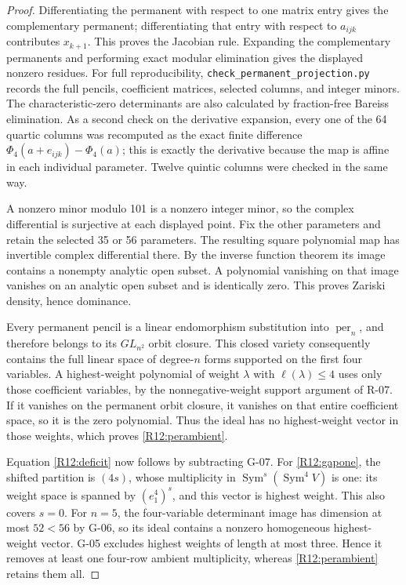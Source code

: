 \documentclass[11pt,a4paper]{article}
\theoremstyle{definition}\newtheorem{definition}{Definition}
\begin{document}
\begin{proof}
Differentiating the permanent with respect to one matrix entry
gives the complementary permanent; differentiating that entry
with respect to $a_{ijk}$ contributes $x_{k+1}$. This proves the
Jacobian rule. Expanding the complementary permanents and
performing exact modular elimination gives the displayed
nonzero residues. For full reproducibility,
\nolinkurl{check_permanent_projection.py} records the full pencils,
coefficient matrices, selected columns, and integer minors.
The characteristic-zero determinants are also calculated by
fraction-free Bareiss elimination. As a second check on the
derivative expansion, every one of the 64 quartic columns was
recomputed as the exact finite difference
$\Phi_4(a+e_{ijk})-\Phi_4(a)$; this is exactly the derivative
because the map is affine in each individual parameter.
Twelve quintic columns were checked in the same way.

A nonzero minor modulo 101 is a nonzero integer minor, so the
complex differential is surjective at each displayed point.
Fix the other parameters and retain the selected 35 or 56
parameters. The resulting square polynomial map has invertible
complex differential there. By the inverse function theorem its
image contains a nonempty analytic open subset. A polynomial
vanishing on that image vanishes on an analytic open subset and
is identically zero. This proves Zariski density, hence dominance.

Every permanent pencil is a linear endomorphism substitution
into $\operatorname{per}_n$, and therefore belongs to its
$GL_{n^2}$ orbit closure. This closed variety consequently
contains the full linear space of degree-$n$ forms supported on
the first four variables. A highest-weight polynomial of weight
$\lambda$ with $\ell(\lambda)\leq4$ uses only those coefficient
variables, by the nonnegative-weight support argument of R-07.
If it vanishes on the permanent orbit closure, it vanishes on
that entire coefficient space, so it is the zero polynomial.
Thus the ideal has no highest-weight vector in those weights,
which proves \eqref{R12:perambient}.

Equation \eqref{R12:deficit} now follows by subtracting G-07.
For \eqref{R12:gapone}, the shifted partition is $(4s)$, whose
multiplicity in $\operatorname{Sym}^s(\operatorname{Sym}^4V)$ is
one: its weight space is spanned by $(e_1^4)^s$, and this vector
is highest weight. This also covers $s=0$.
For $n=5$, the four-variable determinant image has dimension at
most $52<56$ by G-06, so its ideal contains a nonzero homogeneous
highest-weight vector. G-05 excludes highest weights of length
at most three. Hence it removes at least one four-row ambient
multiplicity, whereas \eqref{R12:perambient} retains them all.
\end{proof}
\end{document}
